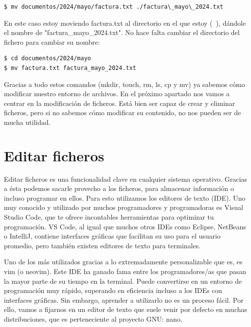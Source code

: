 \begin{tcolorbox-code}
\begin{lstlisting}
$ mv documentos/2024/mayo/factura.txt ./factura\_mayo\_2024.txt
\end{lstlisting}
\end{tcolorbox-code}

En este caso estoy moviendo factura.txt al directorio en el que estoy (~), dándole el nombre de "factura\_mayo\_2024.txt". No hace falta cambiar el directorio del fichero para cambiar su nombre:

\begin{tcolorbox-code}
\begin{lstlisting}
$ cd documentos/2024/mayo
$ mv factura.txt factura_mayo_2024.txt
\end{lstlisting}
\end{tcolorbox-code}

Gracias a todo estos comandos (mkdir, touch, rm, ls, cp y mv) ya sabemos cómo modificar nuestro entorno de archivos. En el próximo apartado nos vamos a centrar en la modificación de ficheros. Está bien ser capaz de crear y eliminar ficheros, pero si no sabemos cómo modificar su contenido, no nos pueden ser de mucha utilidad.

\section{Editar ficheros}
Editar ficheros es una funcionalidad clave en cualquier sistema operativo. Gracias a ésta podemos sacarle provecho a los ficheros, para almacenar información o incluso programar en ellos. Para esto utilizamos los editores de texto (IDE). Uno muy conocido y utilizado por muchos programadores y programadoras es Visual Studio Code, que te ofrece incontables herramientas para optimizar tu programación. VS Code, al igual que muchos otros IDEs como Eclipse, NetBeans o IntelliJ, contiene interfaces gráficas que facilitan su uso para el usuario promedio, pero también existen editores de texto para terminales.



Uno de los más utilizados gracias a lo extremadamente personalizable que es, es vim (o neovim). Este IDE ha ganado fama entre los programadores/as que pasan la mayor parte de su tiempo en la terminal. Puede convertirse en un entorno de programación muy rápido, superando en eficiencia incluso a los IDEs con interfaces gráficas. Sin embargo, aprender a utilizarlo no es un proceso fácil. Por ello, vamos a fijarnos en un editor de texto que suele venir por defecto en muchas distribuciones, que es perteneciente al proyecto GNU: nano.

